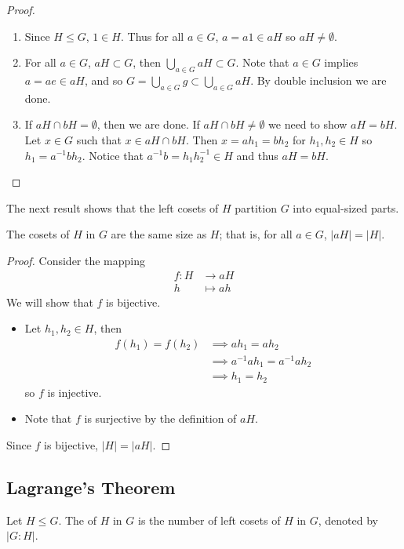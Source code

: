 \begin{proof} \
\begin{enumerate}[label=(\roman*)]
\item Since $H\le G$, $1\in H$. Thus for all $a\in G$, $a=a1\in aH$ so $aH\neq\emptyset$.
\item For all $a\in G$, $aH\subset G$, then $\bigcup_{a\in G}aH\subset G$. Note that $a\in G$ implies $a=ae\in aH$, and so $G=\bigcup_{a\in G}g\subset\bigcup_{a\in G}aH$. By double inclusion we are done.
\item If $aH\cap bH=\emptyset$, then we are done. If $aH\cap bH\neq\emptyset$ we need to show $aH=bH$. Let $x\in G$ such that $x\in aH\cap bH$. Then $x=ah_1=bh_2$ for $h_1,h_2\in H$ so $h_1=a^{-1}bh_2$. Notice that $a^{-1}b=h_1h_2^{-1}\in H$ and thus $aH=bH$.
\end{enumerate}
\end{proof}

The next result shows that the left cosets of $H$ partition $G$ into equal-sized parts.

\begin{lemma}
The cosets of $H$ in $G$ are the same size as $H$; that is, for all $a\in G$, $|aH|=|H|$.
\end{lemma}

\begin{proof}
Consider the mapping
\begin{align*}
f\colon H&\to aH\\
h&\mapsto ah 
\end{align*}
We will show that $f$ is bijective. 
\begin{itemize}
\item Let $h_1,h_2\in H$, then
\begin{align*}
f(h_1)=f(h_2)
&\implies ah_1=ah_2\\
&\implies a^{-1}ah_1=a^{-1}ah_2\\
&\implies h_1=h_2
\end{align*}
so $f$ is injective. 
\item Note that $f$ is surjective by the definition of $aH$. 
\end{itemize}
Since $f$ is bijective, $|H|=|aH|$.
\end{proof}

\subsection{Lagrange's Theorem}
\begin{definition}[Index]
Let $H\le G$. The  of $H$ in $G$ is the number of left cosets of $H$ in $G$, denoted by $|G:H|$.
\end{definition}

